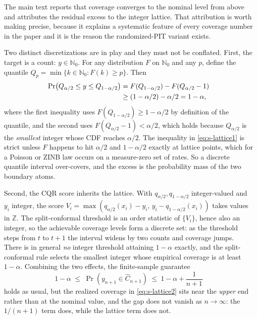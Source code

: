 \documentclass[journal,10pt,onecolumn]{IEEEtran}
\begin{document}
The main text reports that coverage converges to the nominal level from above and
attributes the residual excess to the integer lattice. That attribution is worth
making precise, because it explains a systematic feature of every coverage number
in the paper and it is the reason the randomized-PIT variant exists.

Two distinct discretizations are in play and they must not be conflated. First,
the target is a count: $y \in \mathbb{N}_0$. For any distribution $F$ on
$\mathbb{N}_0$ and any $p$, define the quantile
$Q_p = \min\{k \in \mathbb{N}_0 : F(k) \ge p\}$. Then
\begin{align}
\Pr\!\left(Q_{\alpha/2} \le y \le Q_{1-\alpha/2}\right)
&= F(Q_{1-\alpha/2}) - F(Q_{\alpha/2}-1) \notag\\
&\ge (1-\alpha/2) - \alpha/2 = 1-\alpha,
\label{eq:s-lattice1}
\end{align}
where the first inequality uses $F(Q_{1-\alpha/2}) \ge 1-\alpha/2$ by definition
of the quantile, and the second uses $F(Q_{\alpha/2}-1) < \alpha/2$, which holds
because $Q_{\alpha/2}$ is the \emph{smallest} integer whose CDF reaches
$\alpha/2$. The inequality in \eqref{eq:s-lattice1} is strict unless $F$ happens
to hit $\alpha/2$ and $1-\alpha/2$ exactly at lattice points, which for a Poisson
or ZINB law occurs on a measure-zero set of rates. So a discrete quantile
interval over-covers, and the excess is the probability mass of the two boundary
atoms.

Second, the CQR score inherits the lattice. With $q_{\alpha/2}, q_{1-\alpha/2}$
integer-valued and $y_i$ integer, the score
$V_i = \max(q_{\alpha/2}(x_i) - y_i,\, y_i - q_{1-\alpha/2}(x_i))$ takes values in
$\mathbb{Z}$. The split-conformal threshold is an order statistic of
$\{V_i\}$, hence also an integer, so the achievable coverage levels form a
discrete set: as the threshold steps from $t$ to $t+1$ the interval widens by two
counts and coverage jumps. There is in general \emph{no} integer threshold
attaining $1-\alpha$ exactly, and the split-conformal rule selects the smallest
integer whose empirical coverage is at least $1-\alpha$. Combining the two
effects, the finite-sample guarantee
\begin{equation}
\label{eq:s-lattice2}
1-\alpha \;\le\;
\Pr\!\left(y_{n+1} \in \widehat{C}_{n+1}\right)
\;\le\; 1-\alpha + \frac{1}{n+1}
\end{equation}
holds as usual, but the realized coverage in \eqref{eq:s-lattice2} sits near the
\emph{upper} end rather than at the nominal value, and the gap does not vanish as
$n \to \infty$: the $1/(n+1)$ term does, while the lattice term does not.
\end{document}
